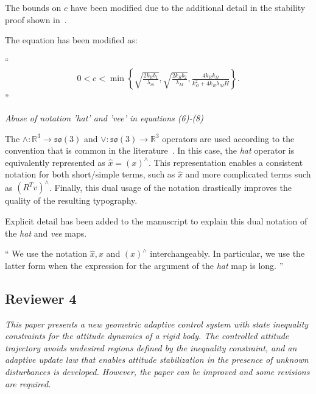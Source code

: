 \documentclass[11pt]{article}
\newcommand{\braces}[1]{\ensuremath{\left\{ #1 \right\}}}
\newcommand{\parenth}[1]{\ensuremath{\left( #1 \right)}}
\newcommand{\so}{\ensuremath{\mathfrak{so}(3)}}
\newcommand{\R}{\ensuremath{\mathbb{R}}}
\newenvironment{correction}{\begin{list}{}{\setlength{\leftmargin}{1cm}\setlength{\rightmargin}{1cm}}\vspace{\parsep}\item[]``}{''\end{list}}
\begin{document}
\begin{enumerate}
The bounds on \( c \) have been modified due to the additional detail in the stability proof shown in~.

The equation has been modified as:
\begin{correction}
    \begin{gather}
        0 < c < \min \braces{\sqrt{\frac{2 k_R b_1}{\lambda_m}},\sqrt{\frac{2 k_R b_2}{\lambda_M}}, \frac{4 k_R k_\Omega}{k_\Omega^2 + 4 k_R \lambda_M H}} .
    \end{gather}
\end{correction}

\item \textit{Abuse of notation 'hat' and 'vee' in equations (6)-(8)}

The \( \wedge : \R^3 \to \so \) and \( \vee : \so \to \R^3 \) operators are used according to the convention that is common in the literature~\cite{lee2010,lee2011a}.
In this case, the \textit{hat} operator is equivalently represented as \( \hat{x} = \parenth{x}^\wedge \).
This representation enables a consistent notation for both short/simple terms, such as \( \hat{x} \) and more complicated terms such as \(\parenth{R^T v}^\wedge\). 
Finally, this dual usage of the notation drastically improves the quality of the resulting typography.

Explicit detail has been added to the manuscript to explain this dual notation of the \textit{hat} and \textit{vee} maps.
\begin{correction}
We use the notation \( \hat{x}, x\) and \( \parenth{x}^\wedge\) interchangeably.
In particular, we use the latter form when the expression for the argument of the \textit{hat} map is long. 
\end{correction}
\end{enumerate}

\subsection*{Reviewer 4}
\textit{This paper presents a new geometric adaptive control system with state inequality constraints for the attitude dynamics of a rigid body. The controlled attitude trajectory avoids undesired regions defined by the inequality constraint, and an adaptive update law that enables attitude stabilization in the presence of unknown disturbances is developed. However, the paper can be improved and some revisions are required.}
\end{document}
